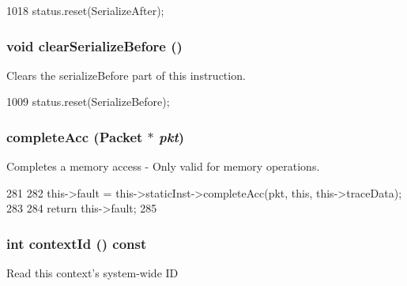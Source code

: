\begin{DoxyCode}
1018 { status.reset(SerializeAfter); }
\end{DoxyCode}
\hypertarget{classInOrderDynInst_a09b692cf6e7b00c1160248452fa24d4b}{
\subsubsection[{clearSerializeBefore}]{\setlength{\rightskip}{0pt plus 5cm}void clearSerializeBefore ()}}
\label{classInOrderDynInst_a09b692cf6e7b00c1160248452fa24d4b}
Clears the serializeBefore part of this instruction. 


\begin{DoxyCode}
1009 { status.reset(SerializeBefore); }
\end{DoxyCode}
\hypertarget{classInOrderDynInst_a1aa06ef95247e55d679456d24fb20456}{
\subsubsection[{completeAcc}]{ completeAcc ({\bf Packet} $\ast$ {\em pkt})}}
\label{classInOrderDynInst_a1aa06ef95247e55d679456d24fb20456}
Completes a memory access -\/ Only valid for memory operations. 


\begin{DoxyCode}
281 {
282     this->fault = this->staticInst->completeAcc(pkt, this, this->traceData);
283 
284     return this->fault;
285 }
\end{DoxyCode}
\hypertarget{classInOrderDynInst_a651d5d14e7a4e95ebe6d7f5b8ee5a107}{
\subsubsection[{contextId}]{\setlength{\rightskip}{0pt plus 5cm}int contextId () const}}
\label{classInOrderDynInst_a651d5d14e7a4e95ebe6d7f5b8ee5a107}
Read this context's system-\/wide ID 


